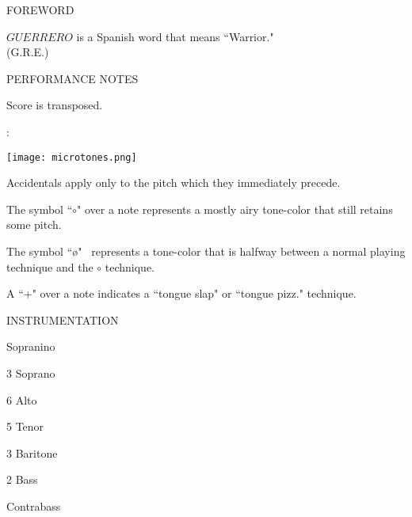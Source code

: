 \documentclass[10pt]{article}
\begin{document}
\begin{center}
\huge FOREWORD
\end{center}

\begin{center}
$GUERRERO$ is a Spanish word that means ``Warrior."\\
\phantom{text} \hfill (G.R.E.)
  \end{center}
  
\vspace*{1\baselineskip}

\begin{center}
\huge PERFORMANCE NOTES
\end{center}

\begin{center}
Score is transposed.
\end{center}

\begin{center}
:
\end{center}

\begin{center}
\texttt{[image: microtones.png]}
\end{center}

\begin{center}
Accidentals apply only to the pitch which they immediately precede.
\end{center}

\begin{center}
The symbol ``$\circ$" over a note represents a mostly airy tone-color that still retains some pitch.
\end{center}

\begin{center}
The symbol ``\o" \ represents a tone-color that is halfway between a normal playing technique and the $\circ$ technique.
\end{center}

\begin{center}
A ``$+$" over a note indicates a ``tongue slap" or ``tongue pizz." technique.
\end{center}

\vspace*{0.3\baselineskip}

\begin{center}
\huge INSTRUMENTATION
\end{center}
\begin{center}
Sopranino
\end{center}
\begin{center}
3 Soprano
\end{center}
\begin{center}
6 Alto
\end{center}
\begin{center}
5 Tenor
\end{center}
\begin{center}
3 Baritone
\end{center}
\begin{center}
2 Bass
\end{center}
\begin{center}
Contrabass
\end{center}
\end{document}
